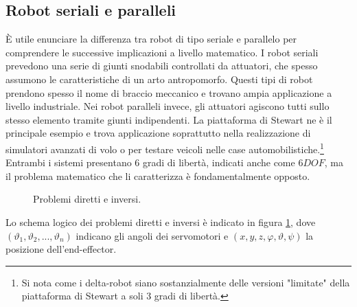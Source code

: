 \documentclass[12pt,twoside,openright]{article}
\begin{document}
\subsection{Robot seriali e paralleli}\label{robotserialiparalleli}
È utile enunciare la differenza tra robot di tipo seriale e parallelo per comprendere le successive implicazioni a livello matematico. I robot seriali prevedono una serie di giunti snodabili controllati da attuatori, che spesso assumono le caratteristiche di un arto antropomorfo. 
Questi tipi di robot prendono spesso il nome di braccio meccanico e trovano ampia applicazione a livello industriale.
Nei robot paralleli invece, gli attuatori agiscono tutti sullo stesso elemento tramite giunti indipendenti. 
La piattaforma di Stewart ne è il principale esempio e trova applicazione soprattutto nella realizzazione di simulatori avanzati di volo o per testare veicoli nelle case automobilistiche.\footnote{Si nota come i delta-robot siano sostanzialmente delle versioni "limitate" della piattaforma di Stewart a soli 3 gradi di libertà.}
Entrambi i sistemi presentano 6 gradi di libertà, indicati anche come $6DOF$, ma il problema matematico che li caratterizza è fondamentalmente opposto.
\begin{figure}
\centering
{}
\caption{Problemi diretti e inversi.} \label{fig:direttoinverso}
\end{figure}
Lo schema logico dei problemi diretti e inversi è indicato in figura \ref{fig:direttoinverso}, dove $(\vartheta_1,\vartheta_2,...,\vartheta_n)$ indicano gli angoli dei servomotori e $(x,y,z,\varphi,\vartheta,\psi)$ la posizione dell'end-effector.
\end{document}
